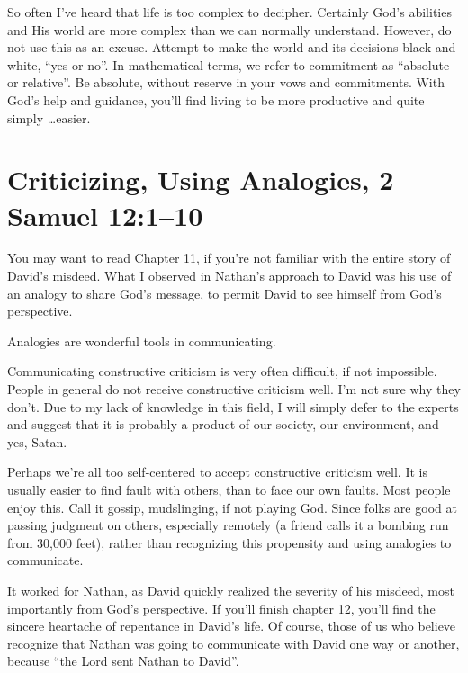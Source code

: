 \documentclass[12pt]{memoir}
\begin{document}
So often I've heard that life is too complex to decipher. Certainly
God's abilities and His world are more complex than we can normally
understand. However, do not use this as an excuse. Attempt to make
the world and its decisions black and white, ``yes or no''. In mathematical terms, we refer to commitment as ``absolute or relative''. Be absolute, without reserve in your vows and commitments. With God's help and guidance, you'll find living to be more productive and quite simply \dots easier.

\section[Criticizing, Using Analogies]{Criticizing, Using Analogies, 2 Samuel 12:1--10}

You may want to read Chapter 11, if you're not familiar with the entire
story of David's misdeed. What I observed in Nathan's approach to
David was his use of an analogy to share God's message, to permit
David to see himself from God's perspective.

Analogies are wonderful tools in communicating.

Communicating constructive criticism is very often difficult, if not
impossible. People in general do not receive constructive criticism
well. I'm not sure why they don't. Due to my lack of knowledge in
this field, I will simply defer to the experts and suggest that it
is probably a product of our society, our environment, and yes, Satan.


Perhaps we're all too self-centered to accept constructive criticism
well. It is usually easier to find fault with others, than to face
our own faults. Most people enjoy this. Call it gossip, mudslinging,
if not playing God. Since folks are good at passing judgment
on others, especially remotely (a friend calls it a bombing run from
30,000 feet), rather than recognizing this propensity and using analogies to communicate.

It worked for Nathan, as David quickly realized the severity of his
misdeed, most importantly from God's perspective. If you'll finish
chapter 12, you'll find the sincere heartache of repentance in David's
life. Of course, those of us who believe recognize that Nathan was going to communicate with David one way or another, because ``the
Lord sent Nathan to David''.
\end{document}

